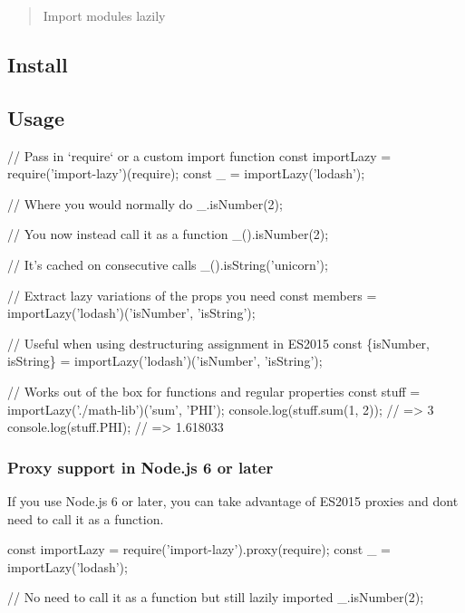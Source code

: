 \begin{quote}
Import modules lazily \end{quote}


\subsection*{Install}




\subsection*{Usage}


\begin{DoxyCode}
// Pass in `require` or a custom import function
const importLazy = require('import-lazy')(require);
const \_ = importLazy('lodash');

// Where you would normally do
\_.isNumber(2);

// You now instead call it as a function
\_().isNumber(2);

// It's cached on consecutive calls
\_().isString('unicorn');

// Extract lazy variations of the props you need
const members = importLazy('lodash')('isNumber', 'isString');

// Useful when using destructuring assignment in ES2015
const \{isNumber, isString\} = importLazy('lodash')('isNumber', 'isString');

// Works out of the box for functions and regular properties
const stuff = importLazy('./math-lib')('sum', 'PHI');
console.log(stuff.sum(1, 2)); // => 3
console.log(stuff.PHI); // => 1.618033
\end{DoxyCode}


\subsubsection*{Proxy support in Node.\+js 6 or later}

If you use Node.\+js 6 or later, you can take advantage of E\+S2015 proxies and don\textquotesingle{}t need to call it as a function.


\begin{DoxyCode}
const importLazy = require('import-lazy').proxy(require);
const \_ = importLazy('lodash');

// No need to call it as a function but still lazily imported
\_.isNumber(2);
\end{DoxyCode}


